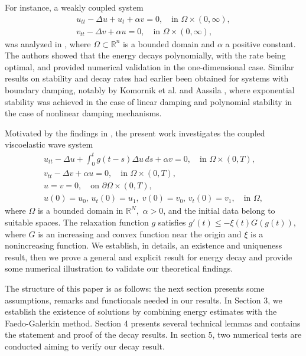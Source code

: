 \documentclass[reqno]{amsart}
\begin{document}
For instance, a weakly coupled system
\begin{gather*}
u_{tt} - \Delta u + u_t + \alpha v = 0, \quad \text{in } \Omega \times (0, \infty), \\
v_{tt} - \Delta v + \alpha u = 0, \quad \text{in } \Omega \times (0, \infty),
\end{gather*}
was analyzed in \cite{LRF}, where $\Omega \subset \mathbb{R}^n$ is a bounded domain and
$\alpha$ a positive constant. The authors showed that the energy decays polynomially,
with the rate being optimal, and provided numerical validation in the one-dimensional case.
Similar results on stability and decay rates had earlier been obtained for systems with
boundary damping, notably by Komornik et al. \cite{KVBR} and Aassila \cite{Assila1, Assila2},
where exponential stability was achieved in the case of linear damping and polynomial stability
in the case of nonlinear damping mechanisms.

Motivated by the findings in \cite{GASM}, the present work investigates the coupled viscoelastic wave system
\begin{equation} \label{e1.1}
\begin{gathered}
u_{tt} - \Delta u + \int_0^t g(t - s) \Delta u \, ds + \alpha v = 0, \quad
 \text{in } \Omega \times (0, T), \\
v_{tt} - \Delta v + \alpha u = 0, \quad \text{in } \Omega \times (0, T), \\
u = v = 0, \quad \text{on } \partial \Omega \times (0, T), \\
u(0) = u_0, \, u_t(0) = u_1, \; v(0) = v_0, \, v_t(0) = v_1, \quad \text{in } \Omega,
\end{gathered}
\end{equation}
where \( \Omega \) is a bounded domain in \( \mathbb{R}^N, \) \( \alpha > 0 \), and the initial
data belong to suitable spaces. The relaxation function \( g \) satisfies
\( g'(t) \leq -\xi(t) G(g(t)) \), where $G$ is an increasing and convex function near the origin and
$\xi$ is a nonincreasing function. We establish, in details, an existence and uniqueness result,
then we prove a general and explicit result for energy decay and provide some numerical
illustration to validate our theoretical findings.

The structure of this paper is as follows: the next section presents some assumptions,
remarks and functionals needed in our results. In Section 3, we establish the existence of
solutions by combining energy estimates with the Faedo-Galerkin method.
Section 4 presents several technical lemmas and contains the statement and proof of the
decay results.
In section 5, two numerical tests are conducted aiming to verify our decay result.
\end{document}
